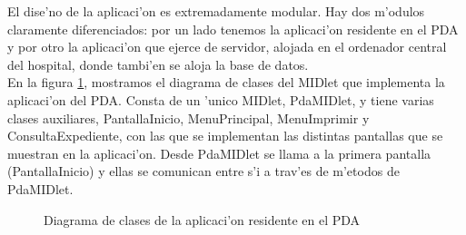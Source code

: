 El dise'no de la aplicaci'on es extremadamente modular. Hay dos m'odulos claramente diferenciados: por un lado tenemos la aplicaci'on residente en el PDA y por otro la aplicaci'on que ejerce de servidor, alojada en el ordenador central del hospital, donde tambi'en se aloja la base de datos.\bigskip \\ En la figura \ref{fig:dclasesPDA}, mostramos el diagrama de clases del MIDlet que implementa la aplicaci'on del PDA. Consta de un 'unico MIDlet, PdaMIDlet, y tiene varias clases auxiliares, PantallaInicio, MenuPrincipal, MenuImprimir y ConsultaExpediente,  con las que se implementan las distintas pantallas que se muestran en la aplicaci'on. Desde PdaMIDlet se llama a la primera pantalla (PantallaInicio) y ellas se comunican entre s'i a trav'es de m'etodos de PdaMIDlet.

\begin{figure}[h!]
	\begin{center}
     	\end{center}
    	\caption{Diagrama de clases de la aplicaci'on residente en el PDA}
	\label{fig:dclasesPDA}
\end{figure}